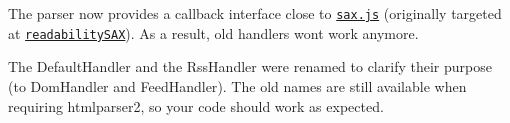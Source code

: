 The parser now provides a callback interface close to \href{https://github.com/isaacs/sax-js}{\tt sax.\+js} (originally targeted at \href{https://github.com/fb55/readabilitysax}{\tt readability\+S\+AX}). As a result, old handlers won\textquotesingle{}t work anymore.

The {\ttfamily Default\+Handler} and the {\ttfamily Rss\+Handler} were renamed to clarify their purpose (to {\ttfamily Dom\+Handler} and {\ttfamily Feed\+Handler}). The old names are still available when requiring {\ttfamily htmlparser2}, so your code should work as expected. 